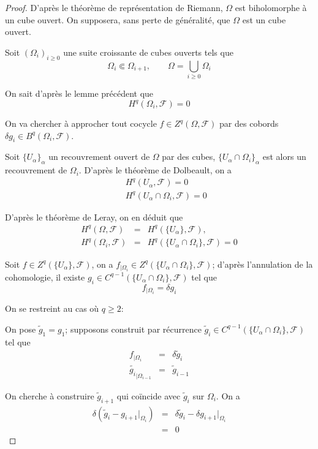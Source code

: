 \documentclass{article}
\theoremstyle{definition}
\theoremstyle{remark}
\begin{document}
\begin{proof}
D'après le théorème de représentation de Riemann, $\Omega$ est biholomorphe à un cube ouvert. On supposera, sans perte de généralité, que $\Omega$ est un cube ouvert.

Soit $(\Omega_i)_{i \geq 0}$ une suite croissante de cubes ouverts tels que
\begin{equation*}
\Omega_i \Subset \Omega_{i+1}, \qquad
\Omega = \bigcup_{i \geq 0} \Omega_i
\end{equation*}

On sait d'après le lemme précédent que
$$H^q(\Omega_i, \mathcal{F})=0$$

On va chercher à approcher tout cocycle $f \in Z^q(\Omega, \mathcal{F})$ par des cobords $\delta g_i \in B^q(\Omega_i, \mathcal{F})$.

Soit $\{U_\alpha\}_\alpha$ un recouvrement ouvert de $\Omega$ par des cubes, $\{U_\alpha \cap \Omega_i\}_\alpha$ est alors un recouvrement de $\Omega_i$. D'après le théorème de Dolbeault, on a
\begin{eqnarray}
\nonumber &&H^q(U_\alpha, \mathcal{F}) = 0 \\
\nonumber &&H^q(U_\alpha \cap \Omega_i, \mathcal{F}) = 0
\end{eqnarray}


D'après le théorème de Leray, on en déduit que
\begin{eqnarray}
\nonumber H^q(\Omega, \mathcal{F}) &=& H^q(\{U_\alpha\}, \mathcal{F}), \\
\nonumber H^q(\Omega_i, \mathcal{F}) &=& H^q(\{U_\alpha \cap \Omega_i\}, \mathcal{F})=0
\end{eqnarray}

Soit $f \in Z^q(\{U_\alpha\}, \mathcal{F})$, on a $f_{|\Omega_i} \in Z^q(\{U_\alpha\cap \Omega_i\}, \mathcal{F})$; d'après l'annulation de la cohomologie, il existe $g_i \in C^{q-1}(\{U_\alpha\cap \Omega_i\}, \mathcal{F})$ tel que
$$f_{|\Omega_i} = \delta g_i$$

On se restreint au cas où $q \geq 2$:

On pose $\tilde{g}_1=g_1$; supposons construit par récurrence $\tilde{g}_i \in  C^{q-1}(\{U_\alpha\cap \Omega_i\}, \mathcal{F})$ tel que
\begin{eqnarray}
\nonumber f_{|\Omega_i} &=& \delta \tilde{g}_i \\
\nonumber \tilde{g_i}_{|\Omega_{i-1}} &=& \tilde{g}_{i-1}
\end{eqnarray}

On cherche à construire $\tilde{g}_{i+1}$ qui coïncide avec $\tilde{g}_i$ sur $\Omega_i$. On a
\begin{eqnarray}
\nonumber \delta(\tilde{g}_i - g_{i+1}{|_{\Omega_{i}}})&=& \delta \tilde{g}_i  - \delta g_{i+1}{|_{\Omega_{i}}}\\
\nonumber &=& 0
\end{eqnarray}


\end{proof}
\end{document}
